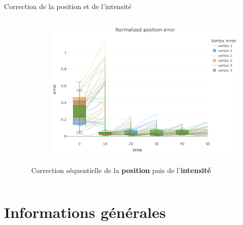 \documentclass[aspectratio=169]{beamer} %
\begin{document}
\begin{frame}{Correction de la position et de l'intensité}
    \vspace{-0.5cm}
    \begin{columns}
        \begin{column}{0.5\textwidth}
            \begin{figure}
                \centering
            \end{figure}
        \end{column}
        \begin{column}{0.5\textwidth}
            \begin{figure}
                \centering
                \includegraphics[width=\textwidth]{../../conference/images/align_part_error.pdf}
            \end{figure}

            Correction séquentielle de la \textbf{position} puis de l'\textbf{intensité}
        \end{column}
    \end{columns}
\end{frame}

\section{Informations générales}
\end{document}
